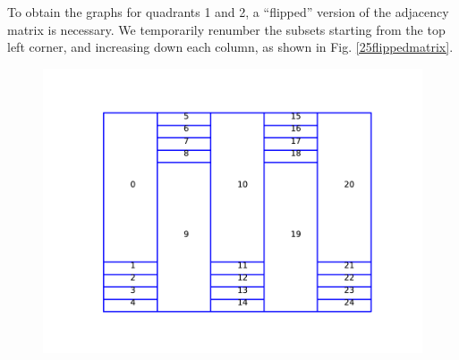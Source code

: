 To obtain the graphs for quadrants 1 and 2, a ``flipped'' version of the adjacency matrix is necessary. 
We temporarily renumber the subsets starting from the top left corner, and increasing down each column, as shown in Fig. \ref{25flippedmatrix}.
\begin{figure}[H]
\begin{minipage}[c]{0.5\textwidth}
\raggedleft
\includegraphics[scale=0.55]{../../figures/boundaries_worst_flipped.pdf}
\end{minipage}
\begin{minipage}[c]{0.5\textwidth}
\end{minipage}
\end{figure}
